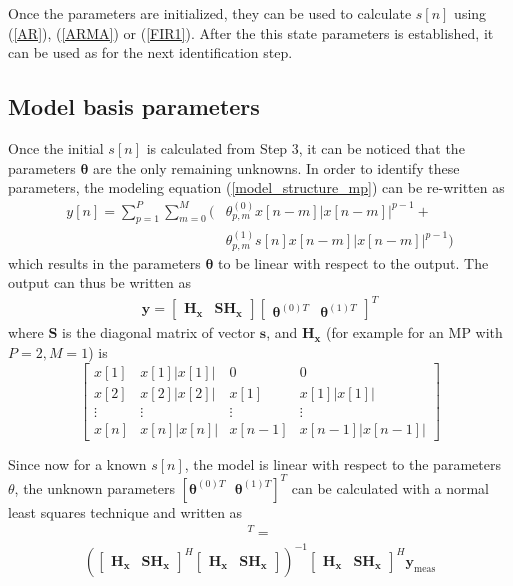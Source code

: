 \documentclass[journal]{IEEEtran}
\begin{document}
Once the parameters are initialized, they can be used to calculate $s[n]$ using (\ref{AR}), (\ref{ARMA}) or (\ref{FIR1}). After 
the this state parameters is established, it can be used as for the next identification step.



\subsection{Model basis parameters}
Once the initial $s[n]$ is calculated from Step 3, it can be noticed that the parameters $\bm{\theta}$ are the only remaining unknowns. In order to identify these parameters, the modeling equation (\ref{model_structure_mp}) can be re-written as
\begin{align}
\nonumber y[n] = \sum_{p=1}^P\sum_{m=0}^M ( &\theta_{p,m}^{(0)}x[n-m]\left|x[n-m]\right|^{p-1} + \\ &\theta_{p,m}^{(1)}s[n]x[n-m]\left|x[n-m]\right|^{p-1} ) \label{model_structure_mp_new}
\end{align}
which results in the parameters $\bm{\theta}$ to be linear with respect to the output. The output can thus be written as
\begin{align}
\mathbf{y} = \mathbf{\left[ \begin{array}{cc} \mathbf{H_x} &  \mathbf{S}\mathbf{H_x}\end{array} \right]}\left[ \begin{array}{cc} \bm{\theta}^{(0) T} &  \bm{\theta}^{(1) T}\end{array} \right]^T
\end{align}
where $\mathbf{S}$ is the diagonal matrix of vector $\mathbf{s}$, and $\mathbf{H_x}$ (for example for an MP with $P=2, M=1$) is
\[ \left[ \begin{array}{cccc}
x[1] & x[1]|x[1]|&0&0\\
x[2] & x[2]|x[2]|&x[1]&x[1]|x[1]|\\
\vdots & \vdots & \vdots & \vdots \\
x[n] &  x[n]|x[n]|&x[n-1] &  x[n-1]|x[n-1]|\end{array} \right]\]

Since now for a known $s[n]$, the model is linear with respect to the parameters $\theta$, the unknown parameters $[\bm{\theta}^{(0) T} \mbox{ } \bm{\theta}^{(1) T}]^T$ can be calculated with a normal least squares technique and written as
\begin{align*}
[\hat{\bm{\theta}^{(0) T}} \mbox{ } \hat{\bm{\theta}^{(1) T}}]^T = \end{align*}
\begin{align} \left(\mathbf{\left[ \begin{array}{cc} \mathbf{H_x} &  \mathbf{S}\mathbf{H_x}\end{array} \right]}^H\mathbf{\left[ \begin{array}{cc} \mathbf{H_x} &  \mathbf{S}\mathbf{H_x}\end{array} \right]}\right)^{-1}
\mathbf{\left[ \begin{array}{cc} \mathbf{H_x} &  \mathbf{S}\mathbf{H_x}\end{array} \right]}^H\mathbf{y}_{\text{meas}}
\label{thetaident}
\end{align}
\end{document}
